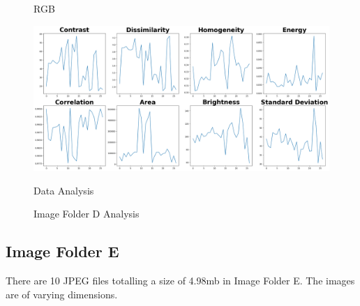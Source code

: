 \begin{figure}[ht]
\begin{minipage}[t]{0.25\textwidth}
        \caption*{RGB}
    \end{minipage}\hfill
    \begin{minipage}[t]{0.50\textwidth}
        \centering
        \includegraphics[width=\textwidth]{Figures/EDA_Charts/5/da.png}
        \caption*{Data Analysis}
    \end{minipage}
    \caption{Image Folder D Analysis}
    \label{fig:Image Folder D Analysis}
\end{figure}

\newpage

\subsection{Image Folder E}

There are 10 JPEG files totalling a size of 4.98mb in Image Folder E. The images are of varying dimensions.

